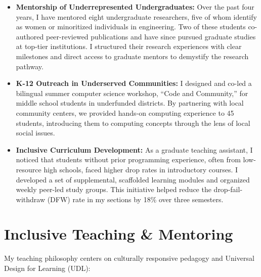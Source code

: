 \documentclass[11pt,letterpaper]{article}
\begin{document}
\begin{itemize}
    \item \textbf{Mentorship of Underrepresented Undergraduates:} Over the past four years, I have mentored eight undergraduate researchers, five of whom identify as women or minoritized individuals in engineering. Two of these students co-authored peer-reviewed publications and have since pursued graduate studies at top-tier institutions. I structured their research experiences with clear milestones and direct access to graduate mentors to demystify the research pathway.
    \item \textbf{K-12 Outreach in Underserved Communities:} I designed and co-led a bilingual summer computer science workshop, ``Code and Community,'' for middle school students in underfunded districts. By partnering with local community centers, we provided hands-on computing experience to 45 students, introducing them to computing concepts through the lens of local social issues.
    \item \textbf{Inclusive Curriculum Development:} As a graduate teaching assistant, I noticed that students without prior programming experience, often from low-resource high schools, faced higher drop rates in introductory courses. I developed a set of supplemental, scaffolded learning modules and organized weekly peer-led study groups. This initiative helped reduce the drop-fail-withdraw (DFW) rate in my sections by 18\% over three semesters.
\end{itemize}

\section{Inclusive Teaching \& Mentoring}

My teaching philosophy centers on culturally responsive pedagogy and Universal Design for Learning (UDL):
\end{document}
